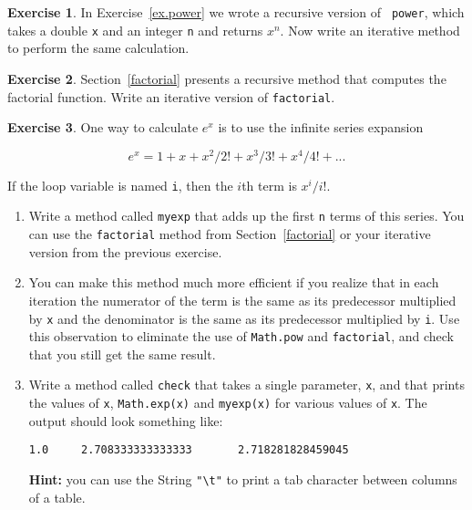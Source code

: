 \documentclass[12pt]{book}
\def\HINT{\textbf{Hint:}}
\theoremstyle{definition}
\newtheorem{excz}{Exercise}[chapter]
\newenvironment{exercise}{\bigskip\begin{excz}\mbox{}}{\end{excz}}
\begin{document}
\begin{exercise}
In Exercise~\ref{ex.power} we wrote a recursive version of {\tt
power}, which takes a double {\tt x} and an integer {\tt n} and
returns $x^n$.  Now write an iterative method to perform the same
calculation.
\end{exercise}

\begin{exercise}
Section~\ref{factorial} presents a recursive method
that computes the factorial function.
Write an iterative version of {\tt factorial}.
\end{exercise}

\begin{exercise}
One way to calculate $e^x$ is to use the infinite series expansion

\begin{equation}
e^x = 1 + x + x^2 / 2! + x^3 / 3! + x^4 / 4! + ...
\end{equation}

If the loop variable is named {\tt i}, then the $i$th term is
$x^i / i!$.

\begin{enumerate}

\item Write a method called {\tt myexp} that adds up the first {\tt n}
terms of this series.  You can use the {\tt factorial}
method from Section~\ref{factorial} or your iterative version from the
previous exercise.

\item You can make this method much more efficient if you realize that
in each iteration the numerator of the term is the same as its
predecessor multiplied by {\tt x} and the denominator is the same as
its predecessor multiplied by {\tt i}.  Use this observation to
eliminate the use of {\tt Math.pow} and {\tt factorial}, and check
that you still get the same result.

\item Write a method called {\tt check} that takes a single parameter,
{\tt x}, and that prints the values of {\tt x}, {\tt Math.exp(x)} and
{\tt myexp(x)} for various values of {\tt x}.  The output should look
something like:

\begin{lstlisting}
1.0     2.708333333333333       2.718281828459045
\end{lstlisting}

\HINT{} you can use the String {\tt "\textbackslash t"} to print a tab character
between columns of a table.


\end{enumerate}
\end{exercise}
\end{document}
